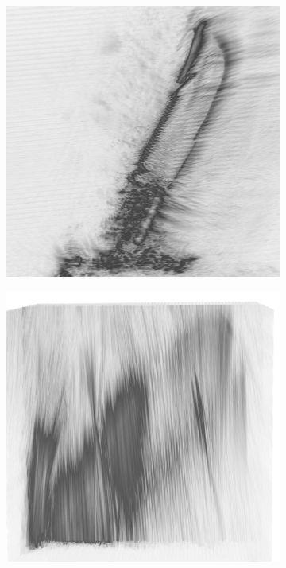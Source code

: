 \documentclass[conference]{IEEEtran}
\begin{document}
\begin{figure} [h]
\begin{subfigure}{.5\linewidth}
				\caption{}
				\label{fig:knife_MIMO_mip}
			\end{subfigure}
			\begin{subfigure}{.5\linewidth}
				\centering
				\includegraphics[width=1\linewidth]{../MatlabResults/knifeSAR_MIMO_Parallel_mip}
				\caption{}
				\label{fig:knife_MIMO_SAR_Parallel_mip}
			\end{subfigure}%
			\begin{subfigure}{.5\linewidth}
				\centering
				\includegraphics[width=1\linewidth]{../MatlabResults/knifeSAR_MIMO_Perp_mip}

\end{subfigure}
\end{figure}
\end{document}
